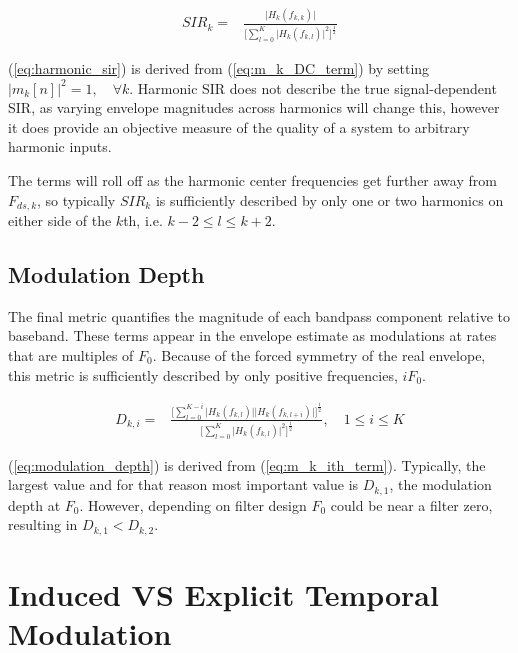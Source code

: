 \documentclass [11pt, proquest,oneside] {ganter_thesis}[2015/03/03]
\begin{document}
\begin{align}
\label{eq:harmonic_sir}
SIR_k =& \frac{\Big| H_k(f_{k,k}) \Big|} {\Bigg[ \sum\limits_{l=0}^K \Big|H_k(f_{k,l})\Big|^2 \Bigg] ^ \frac{1}{2}}
\end{align}

(\ref{eq:harmonic_sir}) is derived from (\ref{eq:m_k_DC_term}) by setting $\Big|m_k[n]\Big|^2 = 1, \quad \forall k$.  Harmonic SIR does not describe the true signal-dependent SIR, as varying envelope magnitudes across harmonics will change this, however it does provide an objective measure of the quality of a system to arbitrary harmonic inputs.

The terms will roll off as the harmonic center frequencies get further away from $F_{ds,k}$, so typically $SIR_k$ is sufficiently described by only one or two harmonics on either side of the $k$th, i.e. $k-2 \leq l \leq k+2$.



\subsection{Modulation Depth}

The final metric quantifies the magnitude of each bandpass component relative to baseband.  These terms appear in the envelope estimate as modulations at rates that are multiples of $F_0$.  Because of the forced symmetry of the real envelope, this metric is sufficiently described by only positive frequencies, $iF_0$.

\begin{align}
\label{eq:modulation_depth}
D_{k,i} =& \frac{\Bigg[ \sum\limits_{l=0}^{K-i} \Big|H_k(f_{k,l})\Big| \Big|H_k(f_{k,l+i})\Big|\Bigg]^\frac{1}{2}}
{\Bigg[ \sum\limits_{l=0}^K \Big|H_k(f_{k,l})\Big|^2 \Bigg] ^ \frac{1}{2}}, \quad 1 \leq i \leq K
\end{align}

(\ref{eq:modulation_depth}) is derived from (\ref{eq:m_k_ith_term}).  Typically, the largest value and for that reason most important value is $D_{k,1}$, the modulation depth at $F_0$.  However, depending on filter design $F_0$ could be near a filter zero, resulting in $D_{k,1} < D_{k,2}$.

\section{Induced VS Explicit Temporal Modulation}\label{section:inducedVexplicit}
\end{document}
